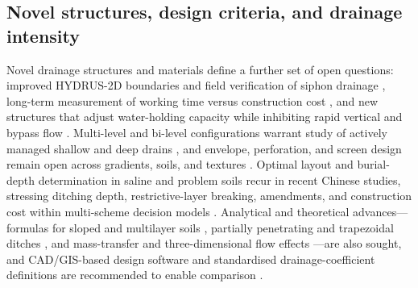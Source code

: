 \documentclass[11pt]{article}
\begin{document}
\subsection{Novel structures, design criteria, and drainage intensity}

Novel drainage structures and materials define a further set of open questions:
improved HYDRUS-2D boundaries and field verification of siphon drainage
\parencite{Ren2023}, long-term measurement of working time versus construction cost
\parencite{Tao2025b}, and new structures that adjust water-holding capacity while
inhibiting rapid vertical and bypass flow \parencite{Li2021}. Multi-level and
bi-level configurations warrant study of actively managed shallow and deep drains
\parencite{Hornbuckle2007,Verma1998,Nelson2011b}, and envelope, perforation, and
screen design remain open across gradients, soils, and textures
\parencite{Alavi2021,Wu2022,Oyarce2017,HajAmor2019}. Optimal layout and
burial-depth determination in saline and problem soils recur in recent Chinese
studies, stressing ditching depth, restrictive-layer breaking, amendments, and
construction cost within multi-scheme decision models
\parencite{Tian2023,Tian2024,Tian2023c,Zhang2024d,Zhai2023,Han2023,Qian2025b,Ren2021,Zheng2025,SerranoCoronel2018,Zegeye2021}.
Analytical and theoretical advances---formulas for sloped and multilayer soils
\parencite{Tao2016,Tao2019}, partially penetrating and trapezoidal ditches
\parencite{Chahar2010,Afruzi2014}, and mass-transfer and three-dimensional flow
effects \parencite{Zhang2024}---are also sought, and CAD/GIS-based design software
and standardised drainage-coefficient definitions are recommended to enable
comparison \parencite{GALLICHAND1992b,Skaggs2017}.
\end{document}
